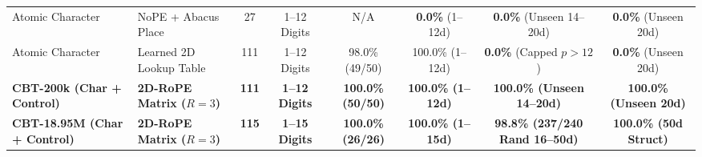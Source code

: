 \documentclass[10pt,twocolumn]{article}
\begin{document}
\begin{table}[t]
{\begin{tabular}{@{}llcccccc@{}}
Atomic Character & NoPE + Abacus Place & 27 & 1--12 Digits & N/A & \textbf{0.0\%} (1--12d) & \textbf{0.0\%} (Unseen 14--20d) & \textbf{0.0\%} (Unseen 20d) \\
Atomic Character & Learned 2D Lookup Table & 111 & 1--12 Digits & 98.0\% (49/50) & 100.0\% (1--12d) & \textbf{0.0\%} (Capped $p > 12$) & \textbf{0.0\%} (Unseen 20d) \\
\midrule
\textbf{CBT-200k (Char + Control)} & \textbf{2D-RoPE Matrix ($R=3$)} & \textbf{111} & \textbf{1--12 Digits} & \textbf{100.0\% (50/50)} & \textbf{100.0\% (1--12d)} & \textbf{100.0\% (Unseen 14--20d)} & \textbf{100.0\% (Unseen 20d)} \\
\textbf{CBT-18.95M (Char + Control)} & \textbf{2D-RoPE Matrix ($R=3$)} & \textbf{115} & \textbf{1--15 Digits} & \textbf{100.0\% (26/26)} & \textbf{100.0\% (1--15d)} & \textbf{98.8\% (237/240 Rand 16--50d)} & \textbf{100.0\% (50d Struct)} \\
\bottomrule
\end{tabular}%
}
\end{table}
\end{document}
